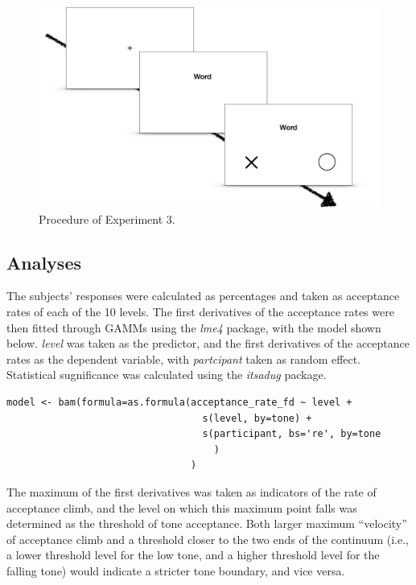 \begin{figure}[h]
\centering
\includegraphics[width=.7\textwidth]{figures/E3/Procedure.png}
\caption{Procedure of Experiment 3.}
\label{Figure:Experiment3Procedure}
\end{figure}

\subsection{Analyses}\label{section:E3 Analyses}
The subjects' responses were calculated as percentages and taken as acceptance rates of each of the 10 levels. The first derivatives of the acceptance rates were then fitted through GAMMs using the \textit{lme4} package, with the model shown below. \textit{level} was taken as the predictor, and the first derivatives of the acceptance rates as the dependent variable, with \textit{partcipant} taken as random effect. Statistical sugnificance was calculated using the \textit{itsadug} package.
\begin{lstlisting}
model <- bam(formula=as.formula(acceptance_rate_fd ~ level + 
                                  s(level, by=tone) + 
                                  s(participant, bs='re', by=tone
                                    )
                                )
\end{lstlisting}
The maximum of the first derivatives was taken as indicators of the rate of acceptance climb, and the level on which this maximum point falls was determined as the threshold of tone acceptance. Both larger maximum ``velocity'' of acceptance climb and a threshold closer to the two ends of the continuum (i.e., a lower threshold level for the low tone, and a higher threshold level for the falling tone) would indicate a stricter tone boundary, and vice versa.